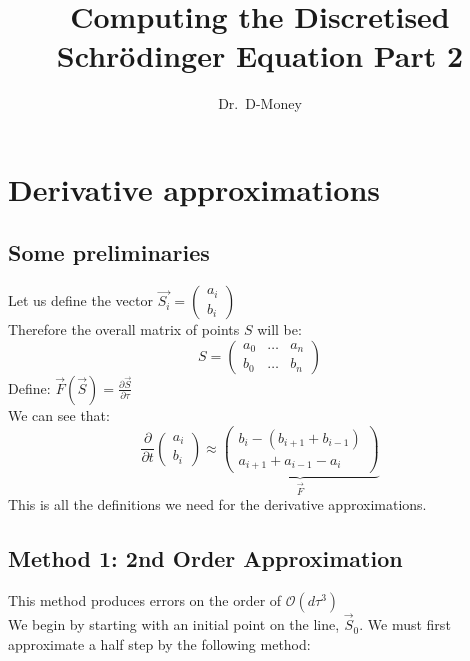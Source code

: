 \documentclass[11pt,letterpaper]{article}
\begin{document}
	\setlength{\parindent}{0pt}
	\setlength{\parskip}{1em}
	\title{Computing the Discretised Schr{\"o}dinger Equation Part 2}
	\author{Dr.\ D-Money}
	\maketitle

	\section{Derivative approximations}
	\subsection{Some preliminaries}
	Let us define the vector $\vec{S_i} = \begin{pmatrix} a_i \\ b_i \end{pmatrix}$\\
	Therefore the overall matrix of points $S$ will be:\\
	\[S=\begin{pmatrix}
		a_0 & \hdots & a_n\\
		b_0 & \hdots & b_n
	\end{pmatrix}\]
	Define: $\vec{F}(\vec{S})=\frac{\partial \vec{S}}{\partial \tau}$\\
	We can see that:\\
	\[\frac{\partial}{\partial t}
	\begin{pmatrix}
		a_i \\
		b_i
	\end{pmatrix}
	\approx
	\underbrace{\begin{pmatrix}
		b_i-(b_{i+1}+b_{i-1})\\
		a_{i+1}+a_{i-1}-a_i
	\end{pmatrix}}_{\vec{F}}
	\]
	This is all the definitions we need for the derivative approximations.
	\subsection{Method 1: 2nd Order Approximation}
	This method produces errors on the order of $\mathcal{O}(d\tau^3)$\\
	We begin by starting with an initial point on the line, $\vec{S}_0$. We must first approximate a half step by the following method:
\end{document}
